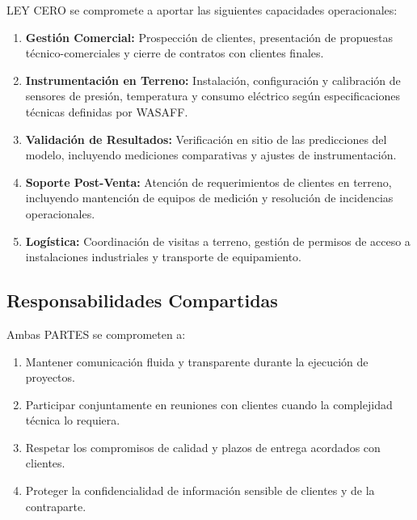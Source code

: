 \documentclass[11pt,letterpaper]{article}
\begin{document}
LEY CERO se compromete a aportar las siguientes capacidades operacionales:

\begin{enumerate}[label=\arabic*.]
    \item \textbf{Gestión Comercial:} Prospección de clientes, presentación de propuestas técnico-comerciales y cierre de contratos con clientes finales.
    
    \item \textbf{Instrumentación en Terreno:} Instalación, configuración y calibración de sensores de presión, temperatura y consumo eléctrico según especificaciones técnicas definidas por WASAFF.
    
    \item \textbf{Validación de Resultados:} Verificación en sitio de las predicciones del modelo, incluyendo mediciones comparativas y ajustes de instrumentación.
    
    \item \textbf{Soporte Post-Venta:} Atención de requerimientos de clientes en terreno, incluyendo mantención de equipos de medición y resolución de incidencias operacionales.
    
    \item \textbf{Logística:} Coordinación de visitas a terreno, gestión de permisos de acceso a instalaciones industriales y transporte de equipamiento.
\end{enumerate}

\subsection{Responsabilidades Compartidas}

Ambas PARTES se comprometen a:

\begin{enumerate}[label=\arabic*.]
    \item Mantener comunicación fluida y transparente durante la ejecución de proyectos.
    \item Participar conjuntamente en reuniones con clientes cuando la complejidad técnica lo requiera.
    \item Respetar los compromisos de calidad y plazos de entrega acordados con clientes.
    \item Proteger la confidencialidad de información sensible de clientes y de la contraparte.
\end{enumerate}

\end{document}
